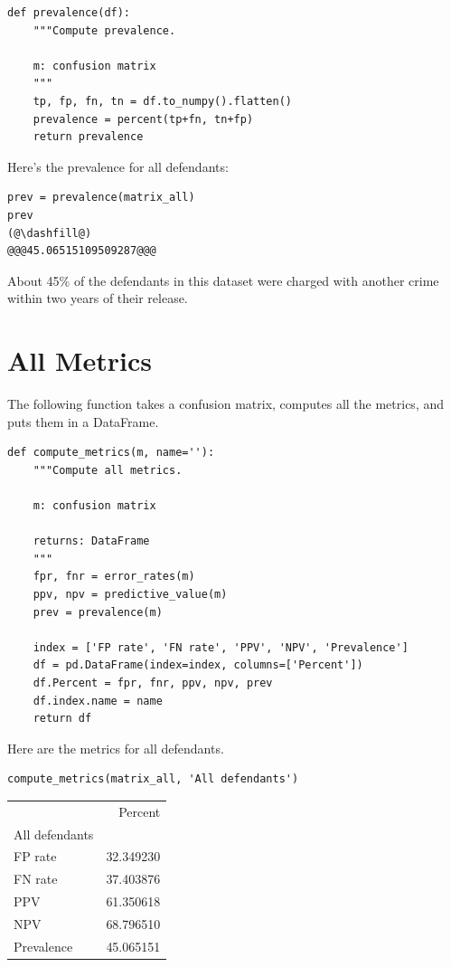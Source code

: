 \begin{lstlisting}[]
def prevalence(df):
    """Compute prevalence.
    
    m: confusion matrix
    """
    tp, fp, fn, tn = df.to_numpy().flatten()
    prevalence = percent(tp+fn, tn+fp)
    return prevalence
\end{lstlisting}

Here's the prevalence for all defendants:

\begin{lstlisting}[]
prev = prevalence(matrix_all)
prev
(@\dashfill@)
@@@45.06515109509287@@@
\end{lstlisting}

About 45\% of the defendants in this dataset were charged with another
crime within two years of their release.

\hypertarget{all-metrics}{%
\section{All Metrics}\label{all-metrics}}

The following function takes a confusion matrix, computes all the
metrics, and puts them in a DataFrame.

\begin{lstlisting}[]
def compute_metrics(m, name=''):
    """Compute all metrics.
    
    m: confusion matrix
    
    returns: DataFrame
    """
    fpr, fnr = error_rates(m)
    ppv, npv = predictive_value(m)
    prev = prevalence(m)
    
    index = ['FP rate', 'FN rate', 'PPV', 'NPV', 'Prevalence']
    df = pd.DataFrame(index=index, columns=['Percent'])
    df.Percent = fpr, fnr, ppv, npv, prev
    df.index.name = name
    return df
\end{lstlisting}

Here are the metrics for all defendants.

\begin{lstlisting}[]
compute_metrics(matrix_all, 'All defendants')
\end{lstlisting}

\begin{tabular}{lr}
\midrule
{} &    Percent \\
All defendants &            \\
\midrule
FP rate        &  32.349230 \\
FN rate        &  37.403876 \\
PPV            &  61.350618 \\
NPV            &  68.796510 \\
Prevalence     &  45.065151 \\
\midrule
\end{tabular}

